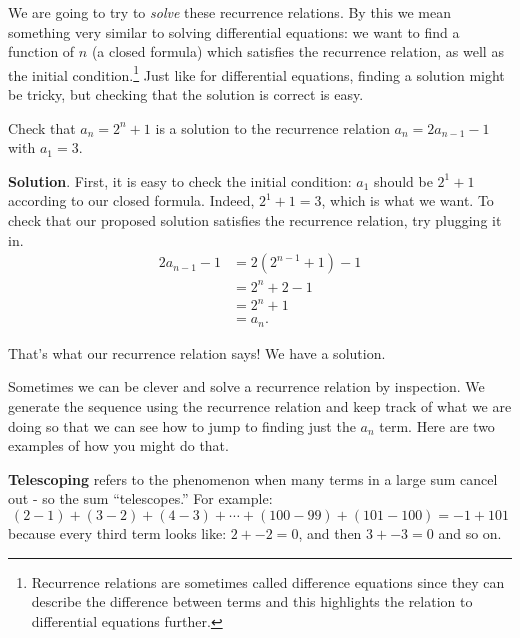 \documentclass[11pt,]{book}
\newcommand{\terminology}[1]{\textbf{#1}}
\theoremstyle{ptxplainnotitle}
\theoremstyle{ptxplaintitle}
\theoremstyle{ptxdefinitionnotitle}
\theoremstyle{ptxdefinitiontitle}
\theoremstyle{ptxdefinitionnotitle}
\theoremstyle{ptxdefinitiontitle}
\theoremstyle{ptxdefinitionnotitle}
\theoremstyle{ptxdefinitiontitle}
\theoremstyle{ptxdefinitiontitlenonumber}
\theoremstyle{ptxdefinitiontitlenonumber}
\numberwithin{equation}{chapter}
\newcommand{\amp}{&}
\begin{document}
\hypertarget{p-423}{}%
We are going to try to \emph{solve} these recurrence relations. By this we mean something very similar to solving differential equations: we want to find a function of \(n\) (a closed formula) which satisfies the recurrence relation, as well as the initial condition.\footnote{Recurrence relations are sometimes called difference equations since they can describe the difference between terms and this highlights the relation to differential equations further.\label{fn-2}} Just like for differential equations, finding a solution might be tricky, but checking that the solution is correct is easy.%
\begin{example}\label{example-19}
\hypertarget{p-424}{}%
Check that \(a_n = 2^n + 1\) is a solution to the recurrence relation \(a_n = 2a_{n-1} - 1\) with \(a_1 = 3\).%
\par\smallskip%
\noindent\textbf{Solution}.\hypertarget{solution-58}{}\quad%
\hypertarget{p-425}{}%
First, it is easy to check the initial condition: \(a_1\) should be \(2^1 + 1\) according to our closed formula. Indeed, \(2^1 + 1 = 3\), which is what we want. To check that our proposed solution satisfies the recurrence relation, try plugging it in.%
\begin{align*}
2a_{n-1} - 1 \amp = 2(2^{n-1} + 1) - 1 \\
\amp = 2^n + 2 - 1 \\
\amp = 2^n +1\\
\amp = a_n.
\end{align*}
%
\par
\hypertarget{p-426}{}%
That's what our recurrence relation says! We have a solution.%
\end{example}
\hypertarget{p-427}{}%
Sometimes we can be clever and solve a recurrence relation by inspection. We generate the sequence using the recurrence relation and keep track of what we are doing so that we can see how to jump to finding just the \(a_n\) term. Here are two examples of how you might do that.%
\par
\hypertarget{p-428}{}%
\terminology{Telescoping} refers to the phenomenon when many terms in a large sum cancel out - so the sum ``telescopes.'' For example:%
\begin{equation*}
(2 - 1) + (3 - 2) + (4 - 3) + \cdots + (100 - 99) + (101 - 100) = -1 + 101
\end{equation*}
because every third term looks like: \(2 + -2 = 0\), and then \(3 + -3 = 0\) and so on.%
\par
\hypertarget{p-429}{}%
\end{document}

